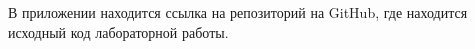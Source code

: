
В приложении находится ссылка на репозиторий на GitHub, где находится исходный код лабораторной работы.
	